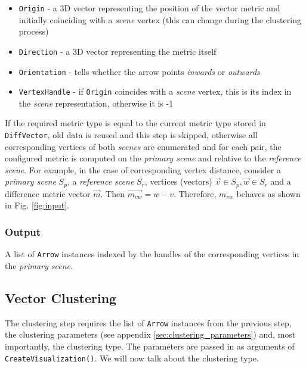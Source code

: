 \begin{itemize}
\item \verb+Origin+ - a 3D vector representing the position of the vector metric and initially coinciding with a {\it scene} vertex (this can change during the clustering process)
\item \verb+Direction+ - a 3D vector representing the metric itself
\item \verb+Orientation+ - tells whether the arrow points {\it inwards} or {\it outwards}
\item \verb+VertexHandle+ - if \verb+Origin+ coincides with a {\it scene} vertex, this is its index in the {\it scene} representation, otherwise it is -1
\end{itemize}

If the required metric type is equal to the current metric type stored in \verb+DiffVector+, old data is reused and this step is skipped, otherwise all corresponding vertices of both {\it scenes} are enumerated and for each pair, the configured metric is computed on the {\it primary scene} and relative to the {\it reference scene}. For example, in the case of corresponding vertex distance, consider a {\it primary scene} \(S_p\), a {\it reference scene} \(S_r\), vertices (vectors) \(\overrightarrow{v} \in S_p, \overrightarrow{w} \in S_r\) and a difference metric vector \(\overrightarrow{m}\). Then \(\overrightarrow{m_{vw}} = w - v\). Therefore, \(m_{vw}\) behaves as shown in Fig. \ref{fig:input}.

\subsubsection{Output}

A list of \verb+Arrow+ instances indexed by the handles of the corresponding vertices in the {\it primary scene}.

\subsection{Vector Clustering}
\label{sec:implementation_clustering}

The clustering step requires the list of \verb+Arrow+ instances from the previous step, the clustering parameters (see appendix \ref{sec:clustering_parameters}) and, most importantly, the clustering type. The parameters are passed in as arguments of \verb+CreateVisualization()+. We will now talk about the clustering type.

